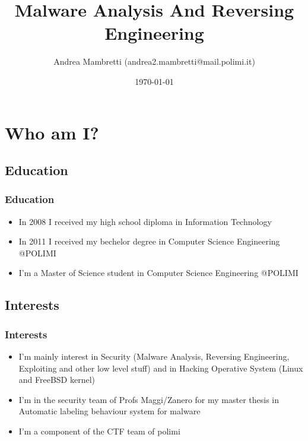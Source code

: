 \documentclass[]{beamer}
\title{Malware Analysis And Reversing Engineering}    %
\author{Andrea Mambretti (andrea2.mambretti@mail.polimi.it)}        %
\institute{Politecnico di Milano}      %
\date{\today}                    %
\begin{document}
\begin{frame}
  \titlepage
\end{frame}

\section[Outline]{}

\begin{frame}
  \tableofcontents
\end{frame}

\section {Who am I?}
	\subsection {Education}
		\begin{frame}
			\frametitle{Education}
			\begin{itemize}
				\item { In 2008 I received my high school diploma in Information Technology} 
				\item { In 2011 I received my bechelor degree in Computer Science Engineering @POLIMI}
				\item { I'm a Master of Science student in Computer Science Engineering @POLIMI}
			\end{itemize}
		\end{frame}
	\subsection {Interests}
		\begin{frame}
			\frametitle{Interests}
			\begin{itemize}
				\item { I'm mainly interest in Security (Malware Analysis, Reversing Engineering, Exploiting and other low level stuff) and in Hacking Operative System (Linux and FreeBSD kernel)}
				\item { I'm in the security team of Profs Maggi/Zanero for my master thesis in Automatic labeling behaviour system for malware }
				\item { I'm a component of the CTF team of polimi}  
			\end{itemize}
		\end{frame}
\end{document}
